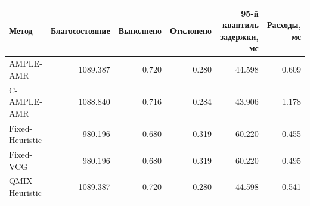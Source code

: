 \begin{tabular}{lrrrrr}
\toprule
 Метод & Благосостояние & Выполнено & Отклонено & 95-й квантиль задержки, мс & Расходы, мс \\
\midrule
 AMPLE-AMR & 1089.387 & 0.720 & 0.280 & 44.598 & 0.609 \\
 C-AMPLE-AMR & 1088.840 & 0.716 & 0.284 & 43.906 & 1.178 \\
 Fixed-Heuristic & 980.196 & 0.680 & 0.319 & 60.220 & 0.455 \\
 Fixed-VCG & 980.196 & 0.680 & 0.319 & 60.220 & 0.495 \\
 QMIX-Heuristic & 1089.387 & 0.720 & 0.280 & 44.598 & 0.541 \\
\bottomrule
\end{tabular}

